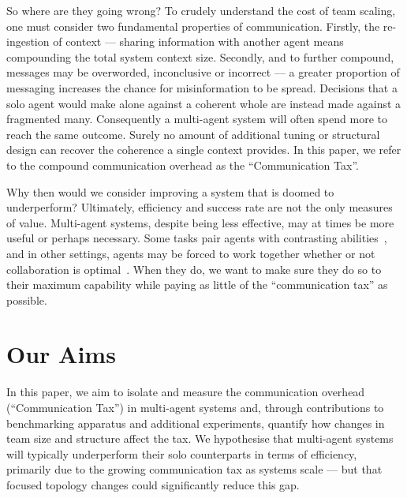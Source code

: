 \documentclass[11pt,a4paper]{article}
\begin{document}
So where are they going wrong? To crudely understand the cost of team scaling, one must consider two fundamental properties of communication. Firstly, the re-ingestion of context --- sharing information with another agent means compounding the total system context size. Secondly, and to further compound, messages may be overworded, inconclusive or incorrect --- a greater proportion of messaging increases the chance for misinformation to be spread. Decisions that a solo agent would make alone against a coherent whole are instead made against a fragmented many. Consequently a multi-agent system will often spend more to reach the same outcome. Surely no amount of additional tuning or structural design can recover the coherence a single context provides. In this paper, we refer to the compound communication overhead as the ``Communication Tax''.

Why then would we consider improving a system that is doomed to underperform? Ultimately, efficiency and success rate are not the only measures of value. Multi-agent systems, despite being less effective, may at times be more useful or perhaps necessary. Some tasks pair agents with contrasting abilities~\cite{lowe2017maddpg}, and in other settings, agents may be forced to work together whether or not collaboration is optimal~\cite{stone2010adhoc}. When they do, we want to make sure they do so to their maximum capability while paying as little of the ``communication tax'' as possible.

%
%
\section{Our Aims}\label{sec:aims}

In this paper, we aim to isolate and measure the communication overhead (``Communication Tax'') in multi-agent systems and, through contributions to benchmarking apparatus and additional experiments, quantify how changes in team size and structure affect the tax. We hypothesise that multi-agent systems will typically underperform their solo counterparts in terms of efficiency, primarily due to the growing communication tax as systems scale --- but that focused topology changes could significantly reduce this gap.

%
%
\end{document}
